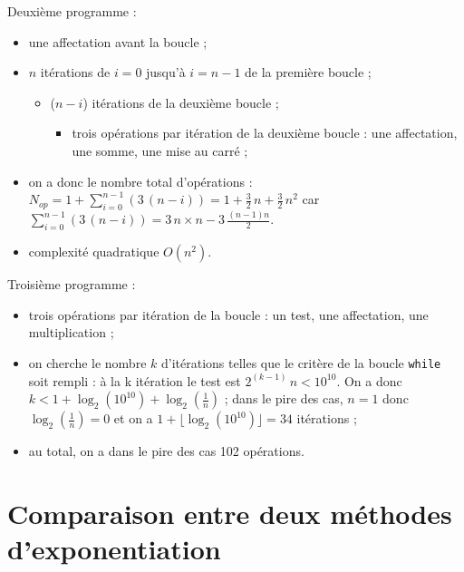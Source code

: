 Deuxième programme : 
\begin{itemize}
  \item une affectation avant la boucle ;
  \item $n$ itérations de $i=0$ jusqu'à $i=n-1$ de la première boucle ; 
      \begin{itemize}
	  \item ($n-i$) itérations de la deuxième boucle ;
	      \begin{itemize}
	      	\item trois opérations par itération de la deuxième boucle : une affectation, une somme, une mise au carré ;
	      \end{itemize}
      \end{itemize}
  \item on a donc le nombre total d'opérations : $\displaystyle N_{op} = 1 + \sum_{i=0}^{n-1} \left( 3\,(n-i)\right) = 1 + \frac{3}{2}\,n + \frac{3}{2}\,n^2$ car $\displaystyle\sum_{i=0}^{n-1} \left( 3\,(n-i)\right) = 3\,n\times n - 3\,\frac{(n-1)n}{2}$.
  \item complexité quadratique $O(n^2)$.
\end{itemize}

Troisième programme : 
\begin{itemize}
  \item trois opérations par itération de la boucle : un test, une affectation, une multiplication ;
  \item on cherche le nombre $k$ d'itérations telles que le critère de la boucle \texttt{while} soit rempli : à la k itération le test est $2^{(k-1)}\,n < 10^{10}$. On a donc $k < 1+\log_2(10^{10}) + \log_2(\frac{1}{n})$ ; dans le pire des cas, $n=1$ donc $\log_2(\frac{1}{n})= 0$ et on a $1+\lfloor \log_2(10^{10}) \rfloor = 34$ itérations ;
  \item au total, on a dans le pire des cas 102 opérations. 
\end{itemize}


\section{Comparaison entre deux méthodes d'exponentiation}

